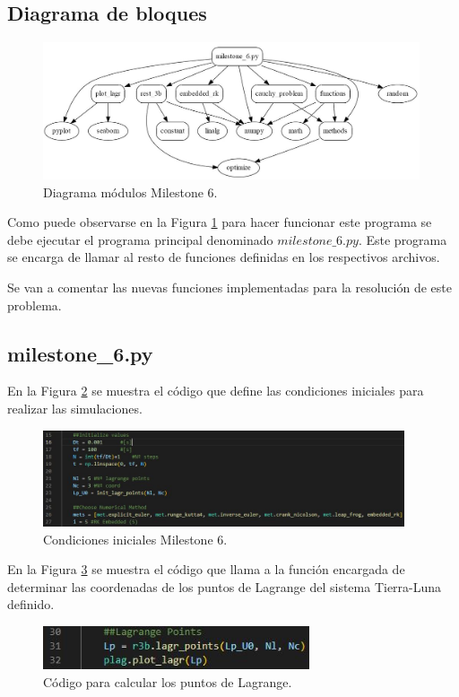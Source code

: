 \documentclass[12pt,a4paper]{article}
\begin{document}
\subsection{Diagrama de bloques}
\begin{figure}[H]
	\centering
	\includegraphics[width=0.99\textwidth]{FIGURES/mil6/codigo/diagrama_mil6.JPG}
	\caption{Diagrama módulos Milestone 6.}
	\label{diagram_mil6}
\end{figure}
Como puede observarse en la Figura \ref{diagram_mil6} para hacer funcionar este programa se debe ejecutar el programa principal denominado $milestone\_6.py$. Este programa se encarga de llamar al resto de funciones definidas en los respectivos archivos.

Se van a comentar las nuevas funciones implementadas para la resolución de este problema.


\subsection{milestone\_6.py}
En la Figura \ref{main1} se muestra el código que define las condiciones iniciales para realizar las simulaciones.
\begin{figure}[H]
	\centering
	\includegraphics[width=0.95\textwidth]{FIGURES/mil6/codigo/main1.JPG}
	\caption{Condiciones iniciales Milestone 6.}
	\label{main1}
\end{figure}

En la Figura \ref{main2} se muestra el código que llama a la función encargada de determinar las coordenadas de los puntos de Lagrange del sistema Tierra-Luna definido.
\begin{figure}[H]
	\centering
	\includegraphics[width=0.7\textwidth]{FIGURES/mil6/codigo/main2.JPG}
	\caption{Código para calcular los puntos de Lagrange.}
	\label{main2}
\end{figure}
\end{document}
